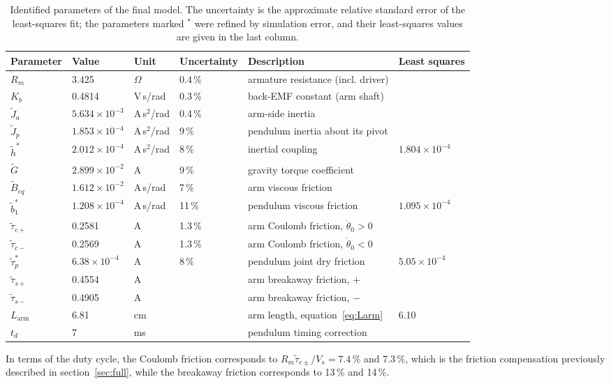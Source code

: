 \documentclass[a4paper,11pt]{article}
\newcommand{\La}{L_{\mathrm{arm}}}
\begin{document}
\begin{table}[h]
\centering
\caption{Identified parameters of the final model. The uncertainty is the approximate relative standard error of the least-squares fit; the parameters marked $^*$ were refined by simulation error, and their least-squares values are given in the last column.}
\label{tab:params}
\small
\begin{tabular}{@{}llllll@{}}
\toprule
Parameter & Value & Unit & Uncertainty & Description & Least squares \\
\midrule
$R_m$ & 3.425 & $\Omega$ & 0.4\,\% & armature resistance (incl. driver) & \\
$K_b$ & 0.4814 & V\,s/rad & 0.3\,\% & back-EMF constant (arm shaft) & \\
$\tilde J_a$ & $5.634\times10^{-3}$ & A\,s$^2$/rad & 0.4\,\% & arm-side inertia & \\
$\tilde J_p$ & $1.853\times10^{-4}$ & A\,s$^2$/rad & 9\,\% & pendulum inertia about its pivot & \\
$\tilde h^*$ & $2.012\times10^{-4}$ & A\,s$^2$/rad & 8\,\% & inertial coupling & $1.804\times10^{-4}$ \\
$\tilde G$ & $2.899\times10^{-2}$ & A & 9\,\% & gravity torque coefficient & \\
$\tilde B_{eq}$ & $1.612\times10^{-2}$ & A\,s/rad & 7\,\% & arm viscous friction & \\
$\tilde b_1^*$ & $1.208\times10^{-4}$ & A\,s/rad & 11\,\% & pendulum viscous friction & $1.095\times10^{-4}$ \\
$\tilde\tau_{c+}$ & 0.2581 & A & 1.3\,\% & arm Coulomb friction, $\dot\theta_0>0$ & \\
$\tilde\tau_{c-}$ & 0.2569 & A & 1.3\,\% & arm Coulomb friction, $\dot\theta_0<0$ & \\
$\tilde\tau_p^*$ & $6.38\times10^{-4}$ & A & 8\,\% & pendulum joint dry friction & $5.05\times10^{-4}$ \\
$\tilde\tau_{s+}$ & 0.4554 & A & & arm breakaway friction, $+$ & \\
$\tilde\tau_{s-}$ & 0.4905 & A & & arm breakaway friction, $-$ & \\
\midrule
$\La$ & 6.81 & cm & & arm length, equation~\ref{eq:Larm} & 6.10 \\
$t_d$ & 7 & ms & & pendulum timing correction & \\
\bottomrule
\end{tabular}
\end{table}

In terms of the duty cycle, the Coulomb friction corresponds to $R_m \tilde\tau_{c\pm}/V_s = 7.4\,\%$ and $7.3\,\%$, which is the friction compensation previously described in section~\ref{sec:full}, while the breakaway friction corresponds to 13\,\% and 14\,\%.
\end{document}
